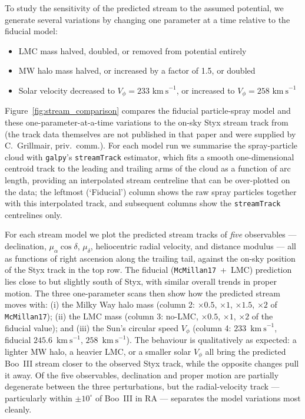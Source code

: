 \documentclass[twocolumn]{aastex631}
\newcommand{\vlosUnits}{$\mathrm{km~s}^{-1}$\xspace}
\begin{document}
\label{tab:streamspray_params}

To study the sensitivity of the predicted stream to the assumed potential, we generate several variations by changing one parameter at a time relative to the fiducial model:
\begin{itemize}[itemsep=0pt]
    \item LMC mass halved, doubled, or removed from potential entirely
    \item MW halo mass halved, or increased by a factor of 1.5, or doubled
    \item Solar velocity decreased to $V_\phi = 233$ \vlosUnits, or increased to $V_\phi = 258$ \vlosUnits
\end{itemize}
Figure~\ref{fig:stream_comparison} compares the fiducial particle-spray model and these one-parameter-at-a-time variations to the on-sky Styx stream track from \citet{Grillmair2009} (the track data themselves are not published in that paper and were supplied by C.~Grillmair, priv.~comm.). For each model run we summarise the spray-particle cloud with \texttt{galpy}'s \texttt{streamTrack} estimator, which fits a smooth one-dimensional centroid track to the leading and trailing arms of the cloud as a function of arc length, providing an interpolated stream centreline that can be over-plotted on the data; the leftmost (`Fiducial') column shows the raw spray particles together with this interpolated track, and subsequent columns show the \texttt{streamTrack} centrelines only.

For each stream model we plot the predicted stream tracks of \emph{five} observables --- declination, $\mu_\alpha\cos\delta$, $\mu_\delta$, heliocentric radial velocity, and distance modulus --- all as functions of right ascension along the trailing tail, against the on-sky position of the Styx track in the top row. The fiducial (\texttt{McMillan17}~+~LMC) prediction lies close to but slightly south of Styx, with similar overall trends in proper motion. The three one-parameter scans then show how the predicted stream moves with: (i) the Milky Way halo mass (column 2: $\times 0.5$, $\times 1$, $\times 1.5$, $\times 2$ of \texttt{McMillan17}); (ii) the LMC mass (column 3: no-LMC, $\times 0.5$, $\times 1$, $\times 2$ of the fiducial value); and (iii) the Sun's circular speed $V_\phi$ (column 4: $233$~\vlosUnits, fiducial $245.6$~\vlosUnits, $258$~\vlosUnits). The behaviour is qualitatively as expected: a lighter MW halo, a heavier LMC, or a smaller solar $V_\phi$ all bring the predicted Boo~III stream closer to the observed Styx track, while the opposite changes pull it away. Of the five observables, declination and proper motion are partially degenerate between the three perturbations, but the radial-velocity track --- particularly within $\pm 10^\circ$ of Boo~III in RA --- separates the model variations most cleanly.
\end{document}
